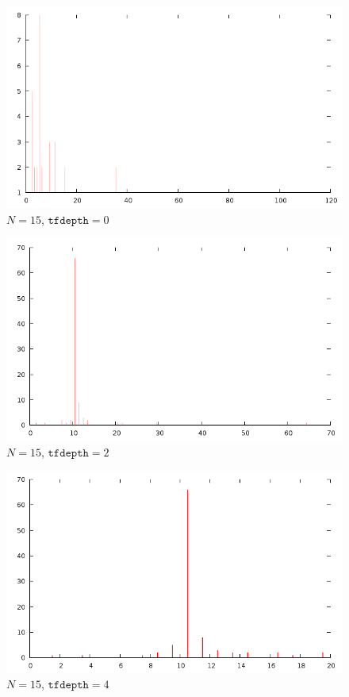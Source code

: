 \documentclass[12pt]{article}
\begin{document}
\begin{figure}[H]
\centering
\caption{$N=15$, $\texttt{tfdepth}=0$}
\includegraphics[scale=0.6]{times15-0.png}
\end{figure} 

\begin{figure}[H]
\centering
\caption{$N=15$, $\texttt{tfdepth}=2$}
\includegraphics[scale=0.6]{times15-2.png}
\end{figure} 

\begin{figure}[H]
\centering
\caption{$N=15$, $\texttt{tfdepth}=4$}
\includegraphics[scale=0.6]{times15-4.png}
\end{figure} 
\end{document}
